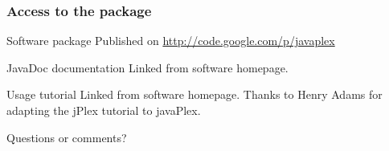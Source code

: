 \documentclass{beamer}
\begin{document}
\begin{frame}
  \frametitle{Access to the package}
  
  \begin{block}{Software package}
    Published on \url{http://code.google.com/p/javaplex}
  \end{block}

  \begin{block}{JavaDoc documentation}
    Linked from software homepage.
  \end{block}

  \begin{block}{Usage tutorial}
    Linked from software homepage. Thanks to Henry Adams for adapting the jPlex tutorial to javaPlex.
  \end{block}

  Questions or comments?
\end{frame}
\end{document}
